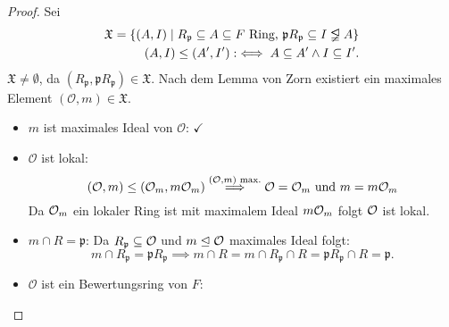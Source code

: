\begin{proof}
    Sei 
    \begin{align*}
        \mathfrak{X}=\{(A,I) \mid R_\mathfrak{p} \subseteq A \subseteq F \text{ Ring, } \mathfrak{p}R_\mathfrak{p} \subseteq I \properideal A\}\\
        (A,I) \leq (A',I') : \iff A \subseteq A' \land I \subseteq I'.
    \end{align*}
    $\mathfrak{X} \ne \emptyset$, da $(R_{\mathfrak{p}}, \mathfrak{p}R_\mathfrak{p}) \in \mathfrak{X}$.
    Nach dem Lemma von Zorn existiert ein maximales Element $(\mathcal{O}, m) \in \mathfrak{X}$.
    \begin{itemize}
        \item $m$ ist maximales Ideal von $\mathcal{O}$: $\checkmark$
        \item $\mathcal{O}$ ist lokal:
        $$(\mathcal{O}, m) \leq (\mathcal{O}_m,m\mathcal{O}_m) \stackrel{(\mathcal{O},m) \text{ max.}}{\implies} \mathcal{O} = \mathcal{O}_m \text{ und } m = m\mathcal{O}_m$$
        Da $\mathcal{O}_m$ ein lokaler Ring ist mit maximalem Ideal $m\mathcal{O}_m$ folgt $\mathcal{O}$ ist lokal.
        \item $m \cap R = \mathfrak{p}$: Da $R_\mathfrak{p} \subseteq \mathcal{O}$ und $m \trianglelefteq \mathcal{O}$ maximales Ideal folgt:
        $$m \cap R_\mathfrak{p} = \mathfrak{p}R_\mathfrak{p} \implies m \cap R = m \cap R_\mathfrak{p} \cap R = \mathfrak{p}R_\mathfrak{p} \cap R = \mathfrak{p}.$$
        \item $\mathcal{O}$ ist ein Bewertungsring von $F$:
        

\end{itemize}
\end{proof}
